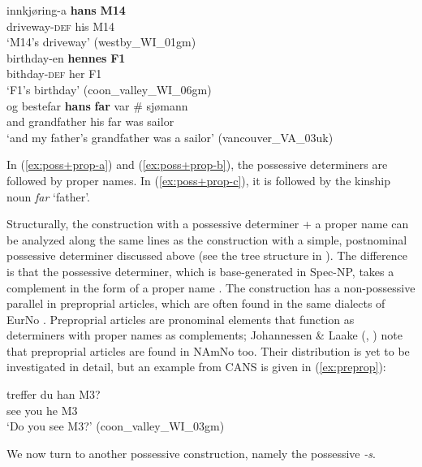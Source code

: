 \documentclass[output=paper,colorlinks,citecolor=brown]{langscibook}
\begin{document}
\ea \label{ex:poss+prop}
\ea \label{ex:poss+prop-a} \gll innkjøring-a \textbf{hans} \textbf{M14} \\
driveway-\textsc{def} his M14 \\
\glt `M14's driveway' (westby\_WI\_01gm)\\
\ex \label{ex:poss+prop-b} \gll birthday-en \textbf{hennes} \textbf{F1} \\
bithday-\textsc{def} her F1 \\
\glt `F1's birthday' (coon\_valley\_WI\_06gm) \\
\ex \label{ex:poss+prop-c} \gll og bestefar \textbf{hans} \textbf{far} var \# sjømann \\
and grandfather his far was {} sailor\\
\glt `and my father's grandfather was a sailor' (vancouver\_VA\_03uk)\\
\z 
\z 

\noindent In (\ref{ex:poss+prop-a}) and (\ref{ex:poss+prop-b}), the possessive determiners are followed by proper names. In (\ref{ex:poss+prop-c}), it is followed by the kinship noun \emph{far} `father'.


Structurally, the construction with a possessive determiner + a proper name can be analyzed along the same lines as the construction with a simple, postnominal possessive determiner discussed above (see the tree structure in ). The difference is that the possessive determiner, which is base-generated in Spec-NP, takes a complement in the form of a proper name \citep[172]{julien2005nominals}. The construction has a non-possessive parallel in preproprial articles, which are often found in the same dialects of EurNo \citep[172]{julien2005nominals}. Preproprial articles are pronominal elements that function as determiners with proper names as complements; Johannessen \& Laake (\citeyear[221]{johannessenlaake2012tomyter}, \citeyear[318]{johannessenlaake2015myths}) note that preproprial articles are found in NAmNo too. Their distribution is yet to be investigated in 
detail, but an example from CANS is given in (\ref{ex:preprop}):

\ea \label{ex:preprop} \gll treffer du han M3?\\
see you he M3\\
\glt `Do you see M3?' (coon\_valley\_WI\_03gm)\\
\z 

\noindent We now turn to another possessive construction, namely the possessive \emph{-s}.
\end{document}
